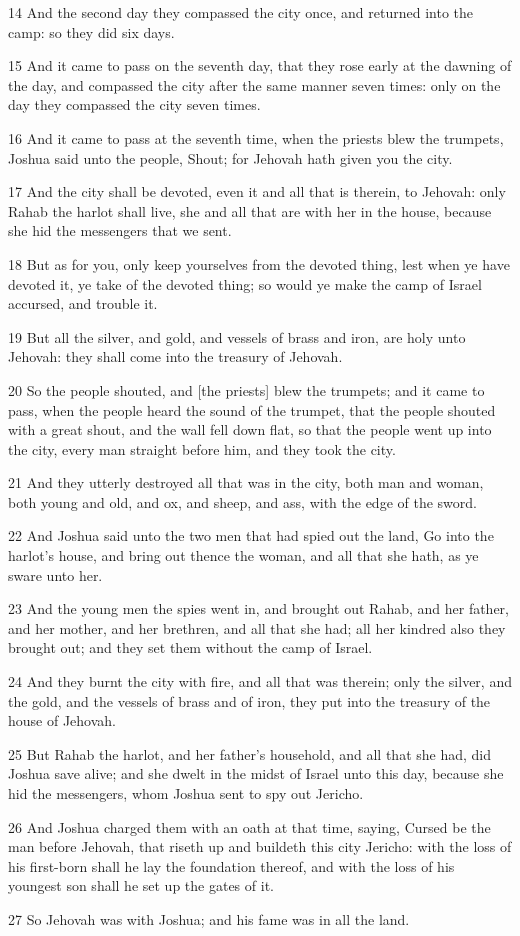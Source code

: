 \par 14 And the second day they compassed the city once, and returned into the camp: so they did six days.
\par 15 And it came to pass on the seventh day, that they rose early at the dawning of the day, and compassed the city after the same manner seven times: only on the day they compassed the city seven times.
\par 16 And it came to pass at the seventh time, when the priests blew the trumpets, Joshua said unto the people, Shout; for Jehovah hath given you the city.
\par 17 And the city shall be devoted, even it and all that is therein, to Jehovah: only Rahab the harlot shall live, she and all that are with her in the house, because she hid the messengers that we sent.
\par 18 But as for you, only keep yourselves from the devoted thing, lest when ye have devoted it, ye take of the devoted thing; so would ye make the camp of Israel accursed, and trouble it.
\par 19 But all the silver, and gold, and vessels of brass and iron, are holy unto Jehovah: they shall come into the treasury of Jehovah.
\par 20 So the people shouted, and [the priests] blew the trumpets; and it came to pass, when the people heard the sound of the trumpet, that the people shouted with a great shout, and the wall fell down flat, so that the people went up into the city, every man straight before him, and they took the city.
\par 21 And they utterly destroyed all that was in the city, both man and woman, both young and old, and ox, and sheep, and ass, with the edge of the sword.
\par 22 And Joshua said unto the two men that had spied out the land, Go into the harlot's house, and bring out thence the woman, and all that she hath, as ye sware unto her.
\par 23 And the young men the spies went in, and brought out Rahab, and her father, and her mother, and her brethren, and all that she had; all her kindred also they brought out; and they set them without the camp of Israel.
\par 24 And they burnt the city with fire, and all that was therein; only the silver, and the gold, and the vessels of brass and of iron, they put into the treasury of the house of Jehovah.
\par 25 But Rahab the harlot, and her father's household, and all that she had, did Joshua save alive; and she dwelt in the midst of Israel unto this day, because she hid the messengers, whom Joshua sent to spy out Jericho.
\par 26 And Joshua charged them with an oath at that time, saying, Cursed be the man before Jehovah, that riseth up and buildeth this city Jericho: with the loss of his first-born shall he lay the foundation thereof, and with the loss of his youngest son shall he set up the gates of it.
\par 27 So Jehovah was with Joshua; and his fame was in all the land.

